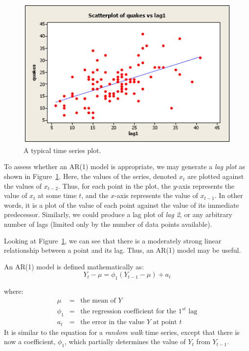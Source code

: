 \documentclass[12pt]{article}
\begin{document}
\begin{figure}
	\includegraphics[width=\textwidth, keepaspectratio]{TimeSeriesArima1-lagplot.png}
	\caption{A typical time series plot.}
	\label{fig:arima1lag}
\end{figure}

To assess whether an AR(1) model is appropriate, we may generate a \textit{lag plot} as shown in Figure~\ref{fig:arima1lag}. Here, the values of the series, denoted $x_t$ are plotted against the values of $x_{t-2}$. Thus, for each point in the plot, the $y$-axis represents the value of $x_t$ at some time $t$, and the $x$-axis represents the value of $x_{t-1}$. In other words, it is a plot of the value of each point against the value of its immediate predecessor. Similarly, we could produce a lag plot of \textit{lag 2}, or any arbitrary number of lags (limited only by the number of data points available).

Looking at Figure~\ref{fig:arima1lag}, we can see that there is a moderately strong linear relationship between a point and its lag. Thus, an AR(1) model may be useful.

An AR(1) model is defined mathematically as:
\begin{equation}
Y_t - \mu = \phi_1 (Y_{t-1} - \mu) + a_t
\label{eqn:arima1}
\end{equation}

where:
\begin{eqnarray}
\mu & = & \textrm{the mean of } Y  \nonumber \\
\phi_1 & = & \textrm{the regression coefficient for the } 1^{st} \textrm{ lag} \nonumber \\
a_t & = & \textrm{the error in the value }Y \textrm{ at point } t \nonumber
\end{eqnarray}
It is similar to the equation for a \textit{random walk} time series, except that there is now a coefficient, $\phi_1$, which partially determines the value of $Y_t$ from $Y_{t-1}$.
\end{document}
